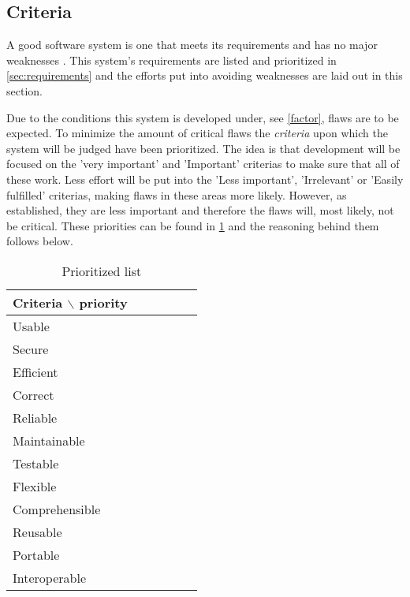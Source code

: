 \documentclass[../../master.tex]{subfiles}
\begin{document}
\subsection{Criteria}\label{sec:architecturecriteria}
A good software system is one that meets its requirements and has no major weaknesses \citep[p.~179]{Rod-Aalborg}.
This system's requirements are listed and prioritized in \cref{sec:requirements} and the efforts put into avoiding weaknesses are laid out in this section.

Due to the conditions this system is developed under, see \cref{factor}, flaws are to be expected.
To minimize the amount of critical flaws the \textit{criteria} \citep[p.~180]{Rod-Aalborg} upon which the system will be judged have been prioritized.
The idea is that development will be focused on the 'very important' and 'Important' criterias to make sure that all of these work.
Less effort will be put into the 'Less important', 'Irrelevant' or 'Easily fulfilled' criterias, making flaws in these areas more likely.
However, as established, they are less important and therefore the flaws will, most likely, not be critical.
These priorities can be found in \cref{fig:criteria} and the reasoning behind them follows below.

\begin{table}[H]
	\begin{center}
		\begin{tabular}{|l|c|c|c|c|c|}
			\hline
			Criteria $\backslash$ priority & \rotatebox{90}{Very important} &  \rotatebox{90}{Important} & \rotatebox{90}{Less important} & \rotatebox{90}{Irrelevant} & \rotatebox{90}{Easily fulfilled}\\
			\hline
			Usable & \xmark & & & & \\
			\hline
			Secure & & & & \xmark & \\
			\hline
			Efficient & & & & & \xmark \\
			\hline
			Correct & & \xmark & & & \\
			\hline
			Reliable & \xmark & & & & \\
			\hline
			Maintainable & & & \xmark & & \\
			\hline
			Testable & & \xmark & & & \\
			\hline
			Flexible & & & & \xmark & \\
			\hline
			Comprehensible & & \xmark & & & \\
			\hline
			Reusable & & & \xmark & & \\
			\hline
			Portable & & & & \xmark & \\
			\hline
			Interoperable & & & & \xmark & \\
			\hline
		\end{tabular}
	\end{center}
	\caption{Prioritized list}\label{fig:criteria}
\end{table}
\end{document}
